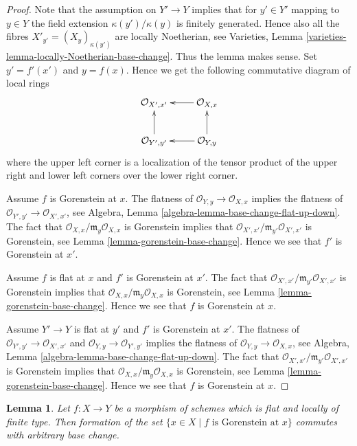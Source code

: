 \documentclass{stacks-project}
\theoremstyle{plain}
\newtheorem{lemma}[subsection]{Lemma}
\theoremstyle{definition}
\theoremstyle{remark}
\numberwithin{equation}{subsection}
\begin{document}
\begin{proof}
Note that the assumption on $Y' \to Y$ implies that for $y' \in Y'$
mapping to $y \in Y$ the field extension $\kappa(y')/\kappa(y)$
is finitely generated. Hence also all the fibres
$X'_{y'} = (X_y)_{\kappa(y')}$ are locally Noetherian, see
Varieties, Lemma \ref{varieties-lemma-locally-Noetherian-base-change}.
Thus the lemma makes sense. Set $y' = f'(x')$ and $y = f(x)$.
Hence we get the following commutative diagram of local rings
$$
\xymatrix{
\mathcal{O}_{X', x'} & \mathcal{O}_{X, x} \ar[l] \\
\mathcal{O}_{Y', y'} \ar[u] & \mathcal{O}_{Y, y} \ar[l] \ar[u]
}
$$
where the upper left corner is a localization of the tensor product
of the upper right and lower left corners over the lower right corner.

\medskip\noindent
Assume $f$ is Gorenstein at $x$.
The flatness of $\mathcal{O}_{Y, y} \to \mathcal{O}_{X, x}$
implies the flatness of $\mathcal{O}_{Y', y'} \to \mathcal{O}_{X', x'}$, see
Algebra, Lemma \ref{algebra-lemma-base-change-flat-up-down}.
The fact that $\mathcal{O}_{X, x}/\mathfrak m_y\mathcal{O}_{X, x}$
is Gorenstein implies that
$\mathcal{O}_{X', x'}/\mathfrak m_{y'}\mathcal{O}_{X', x'}$
is Gorenstein, see
Lemma \ref{lemma-gorenstein-base-change}. Hence we see that $f'$
is Gorenstein at $x'$.

\medskip\noindent
Assume $f$ is flat at $x$ and $f'$ is Gorenstein at $x'$.
The fact that $\mathcal{O}_{X', x'}/\mathfrak m_{y'}\mathcal{O}_{X', x'}$
is Gorenstein implies that
$\mathcal{O}_{X, x}/\mathfrak m_y\mathcal{O}_{X, x}$
is Gorenstein, see
Lemma \ref{lemma-gorenstein-base-change}. Hence we see that $f$
is Gorenstein at $x$.

\medskip\noindent
Assume $Y' \to Y$ is flat at $y'$ and $f'$ is Gorenstein at
$x'$. The flatness of $\mathcal{O}_{Y', y'} \to \mathcal{O}_{X', x'}$
and $\mathcal{O}_{Y, y} \to \mathcal{O}_{Y', y'}$ implies the flatness
of $\mathcal{O}_{Y, y} \to \mathcal{O}_{X, x}$, see
Algebra, Lemma \ref{algebra-lemma-base-change-flat-up-down}.
The fact that $\mathcal{O}_{X', x'}/\mathfrak m_{y'}\mathcal{O}_{X', x'}$
is Gorenstein implies that
$\mathcal{O}_{X, x}/\mathfrak m_y\mathcal{O}_{X, x}$
is Gorenstein, see
Lemma \ref{lemma-gorenstein-base-change}. Hence we see that $f$
is Gorenstein at $x$.
\end{proof}

\begin{lemma}
\label{lemma-flat-lft-base-change-gorenstein}
Let $f : X \to Y$ be a morphism of schemes which is flat and
locally of finite type. Then formation of the set
$\{x \in X \mid f\text{ is Gorenstein at }x\}$
commutes with arbitrary base change.
\end{lemma}
\end{document}
